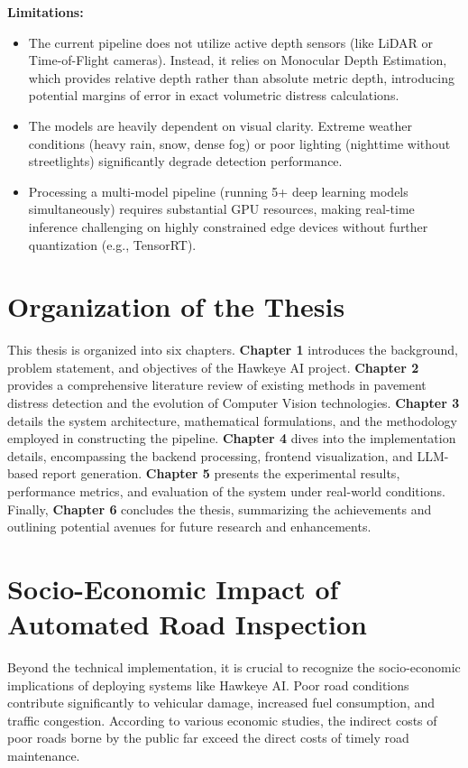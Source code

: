 \textbf{Limitations:}
\begin{itemize}
    \item The current pipeline does not utilize active depth sensors (like LiDAR or Time-of-Flight cameras). Instead, it relies on Monocular Depth Estimation, which provides relative depth rather than absolute metric depth, introducing potential margins of error in exact volumetric distress calculations.
    \item The models are heavily dependent on visual clarity. Extreme weather conditions (heavy rain, snow, dense fog) or poor lighting (nighttime without streetlights) significantly degrade detection performance.
    \item Processing a multi-model pipeline (running 5+ deep learning models simultaneously) requires substantial GPU resources, making real-time inference challenging on highly constrained edge devices without further quantization (e.g., TensorRT).
\end{itemize}

\section{Organization of the Thesis}
This thesis is organized into six chapters. \textbf{Chapter 1} introduces the background, problem statement, and objectives of the Hawkeye AI project. \textbf{Chapter 2} provides a comprehensive literature review of existing methods in pavement distress detection and the evolution of Computer Vision technologies. \textbf{Chapter 3} details the system architecture, mathematical formulations, and the methodology employed in constructing the pipeline. \textbf{Chapter 4} dives into the implementation details, encompassing the backend processing, frontend visualization, and LLM-based report generation. \textbf{Chapter 5} presents the experimental results, performance metrics, and evaluation of the system under real-world conditions. Finally, \textbf{Chapter 6} concludes the thesis, summarizing the achievements and outlining potential avenues for future research and enhancements.

\section{Socio-Economic Impact of Automated Road Inspection}
Beyond the technical implementation, it is crucial to recognize the socio-economic implications of deploying systems like Hawkeye AI. Poor road conditions contribute significantly to vehicular damage, increased fuel consumption, and traffic congestion. According to various economic studies, the indirect costs of poor roads borne by the public far exceed the direct costs of timely road maintenance. 

